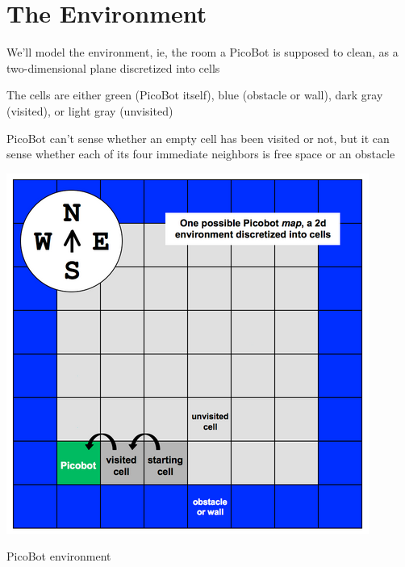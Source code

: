 \documentclass[8pt,a4paper,compress]{beamer}
\begin{document}
\section{The Environment}
\begin{frame}[fragile]
\begin{minipage}{200pt}
We'll model the environment, ie, the room a PicoBot is supposed to clean, as a two-dimensional plane discretized into cells

\bigskip

The cells are either green (PicoBot itself), blue (obstacle or wall), dark gray (visited), or light gray (unvisited)

\bigskip

PicoBot can't sense whether an empty cell has been visited or not, but it can sense whether each of its four immediate neighbors is free space or an obstacle
\end{minipage}\hfill%
\begin{minipage}{100pt}
\begin{center}
\includegraphics[scale=0.25]{figures/picobot_env.png}

\smallskip

\tiny PicoBot environment
\end{center}
\end{minipage}

\smallskip

\begin{minipage}{200pt}


\end{minipage}
\end{frame}
\end{document}
